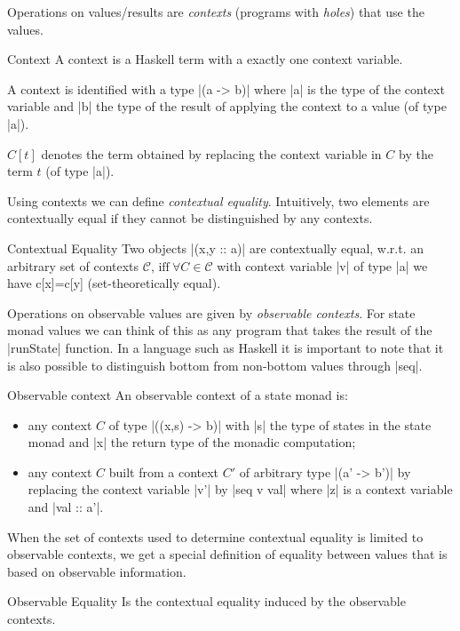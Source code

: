 Operations on values/results are \emph{contexts} (programs with
\emph{holes}) that use the values.
%
\begin{definition}{Context}
A context is a Haskell term with a exactly one context variable.

A context is identified with a type |(a -> b)| where |a| is the type
of the context variable and |b| the type of the result of applying
the context to a value (of type |a|).

$C[t]$ denotes the term obtained by replacing the context variable in
$C$ by the term $t$ (of type |a|).
\end{definition}


Using contexts we can define \emph{contextual equality}.
%
Intuitively, two elements are contextually equal if they cannot be
distinguished by any contexts.
%
\begin{definition}{Contextual Equality}
Two objects |(x,y :: a)| are contextually equal, w.r.t. an arbitrary
set of contexts $\mathcal{C}$, $\mbox{iff}\ \forall C \in \mathcal{C}$
with context variable |v| of type |a| we have c[x]=c[y]
(set-theoretically equal).
\end{definition}


Operations on observable values are given by \emph{observable
  contexts}.
%
For state monad values we can think of this as any program that takes
the result of the |runState| function.
%
In a language such as Haskell it is important to note that it is also
possible to distinguish bottom from non-bottom values through |seq|.
%
\begin{definition}{Observable context}
An observable context of a state monad is:
\begin{itemize}
\item any context $C$ of type |((x,s) -> b)| with |s| the type of
  states in the state monad and |x| the return type of the monadic
  computation;
\item any context $C$ built from a context $C'$ of arbitrary type |(a'
  -> b')| by replacing the context variable |v'| by |seq v val| where
  |z| is a context variable and |val :: a'|. 
\end{itemize}
\end{definition}


When the set of contexts used to determine contextual equality is
limited to observable contexts, we get a special definition of
equality between values that is based on observable information.
%
\begin{definition}{Observable Equality}
Is the contextual equality induced by the observable contexts.
\end{definition}


